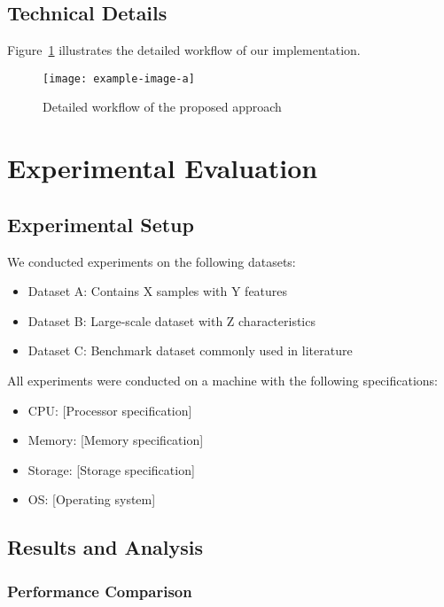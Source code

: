 \subsection{Technical Details}

\lipsum[10-11]

Figure~\ref{fig:paperone-workflow} illustrates the detailed workflow of our implementation.

\begin{figure}[!htb]
    \centering
    \texttt{[image: example-image-a]}
    \caption{Detailed workflow of the proposed approach}
    \label{fig:paperone-workflow}
\end{figure}

\section{Experimental Evaluation}

\subsection{Experimental Setup}

We conducted experiments on the following datasets:
\begin{itemize}
    \item Dataset A: Contains X samples with Y features
    \item Dataset B: Large-scale dataset with Z characteristics
    \item Dataset C: Benchmark dataset commonly used in literature
\end{itemize}

All experiments were conducted on a machine with the following specifications:
\begin{itemize}
    \item CPU: [Processor specification]
    \item Memory: [Memory specification] 
    \item Storage: [Storage specification]
    \item OS: [Operating system]
\end{itemize}

\subsection{Results and Analysis}

\subsubsection{Performance Comparison}


